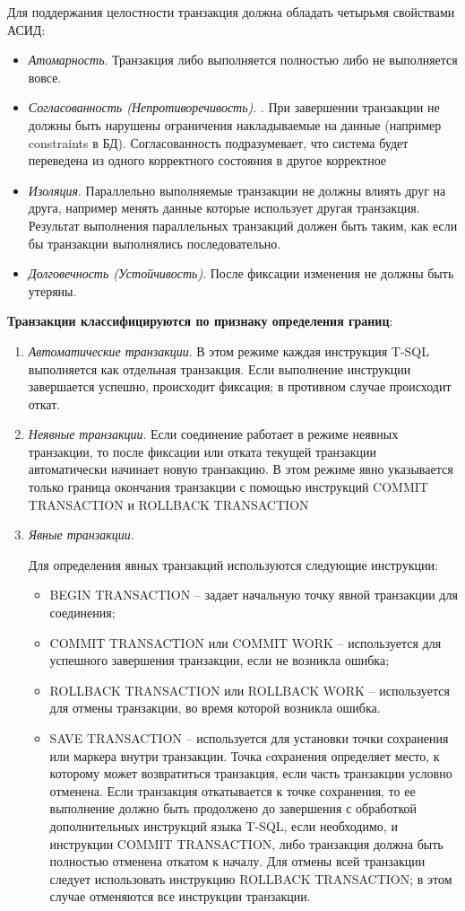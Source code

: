Для поддержания целостности транзакция должна обладать четырьмя свойствами АСИД:
\begin{itemize}
	\item \textit{Атомарность}. Транзакция либо выполняется полностью либо не выполняется вовсе.
	\item \textit{Согласованность (Непротиворечивость)}. . При завершении транзакции не должны быть нарушены ограничения накладываемые на данные (например constraints в БД). Согласованность подразумевает, что система будет переведена из одного корректного состояния в другое корректное
	\item \textit{Изоляция}. Параллельно выполняемые транзакции не должны влиять друг на друга,
	например менять данные которые использует другая транзакция. Результат выполнения параллельных транзакций должен быть таким, как если бы транзакции выполнялись последовательно.
	\item \textit{Долговечность (Устойчивость)}. После фиксации изменения не должны быть утеряны.
\end{itemize}

\textbf{Транзакции классифицируются по признаку определения границ}:
\begin{enumerate}
	\item \textit{Автоматические транзакции}. В этом режиме каждая инструкция T-SQL выполняется как отдельная транзакция. Если выполнение инструкции завершается успешно, происходит фиксация; в противном случае происходит откат.
	\item \textit{Неявные транзакции}. Если соединение работает в режиме неявных транзакции, то после фиксации или отката текущей транзакции автоматически начинает новую транзакцию. В этом режиме явно указывается только граница окончания транзакции с помощью инструкций COMMIT TRANSACTION и ROLLBACK TRANSACTION
	\item \textit{Явные транзакции}.
	
	Для определения явных транзакций используются следующие инструкции:
	\begin{itemize}
		\item BEGIN TRANSACTION – задает начальную точку явной транзакции для соединения;
		\item COMMIT TRANSACTION или COMMIT WORK – используется для успешного завершения транзакции, если не возникла ошибка;
		\item ROLLBACK TRANSACTION или ROLLBACK WORK – используется для отмены транзакции, во время которой возникла ошибка.
		\item SAVE TRANSACTION – используется для установки точки сохранения или маркера внутри транзакции. Точка cохранения определяет место, к которому может возвратиться транзакция, если часть транзакции условно отменена. Если транзакция откатывается к точке сохранения, то ее выполнение должно быть продолжено до завершения с обработкой дополнительных инструкций языка T-SQL, если необходимо, и инструкции COMMIT TRANSACTION, либо транзакция должна быть полностью отменена откатом к началу. Для отмены всей транзакции следует использовать инструкцию ROLLBACK TRANSACTION; в этом случае отменяются все инструкции транзакции.
	\end{itemize}
\end{enumerate}

